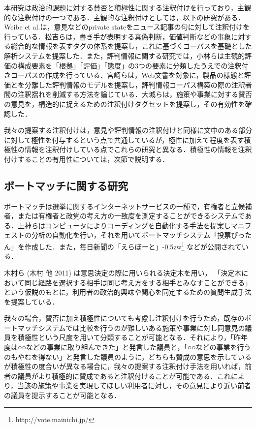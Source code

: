 \documentclass[japanese]{jnlp_1.4}
\begin{document}
本研究は政治的課題に対する賛否と積極性に関する注釈付けを行っており，主観的な注釈付けの一つである．主観的な注釈付けとしては，以下の研究がある．Weibe et al.\cite{wb}は，意見などのprivate stateをニュース記事の句に対して注釈付けを行っている．松吉ら\cite{mtys}は，書き手が表明する真偽判断，価値判断などの事象に対する総合的な情報を表すタグの体系を提案し，これに基づくコーパスを基礎とした解析システムを提案した．また，評判情報に関する研究では，小林ら\cite{kbys}は主観的評価の構成要素を「根拠」「評価」「態度」の3つの要素に分類したうえでの注釈付きコーパスの作成を行っている．宮崎ら\cite{myzk}は，Web文書を対象に，製品の様態と評価とを分離した評判情報のモデルを提案し，評判情報コーパス構築の際の注釈者間の注釈揺れを削減する方法を論じている．大城ら\cite{osr}は，施策や事業に対する賛否の意見を，構造的に捉えるための注釈付けタグセットを提案し，その有効性を確認した．

我々の提案する注釈付けは，意見や評判情報の注釈付けと同様に文中のある部分に対して極性を付与するという点で共通しているが，極性に加えて程度を表す積極性の情報を注釈付けしている点でこれらの研究と異なる．積極性の情報を注釈付けすることの有用性については，次節で説明する．


\subsection{ボートマッチに関する研究}

ボートマッチは選挙に関するインターネットサービスの一種で，有権者と立候補者，または有権者と政党の考え方の一致度を測定することができるシステムである．上神ら\cite{uekm,uekm2,kgm}はコンピュータによりコーディングを自動化する手法を提案しマニフェストの分析の自動化を行い，それを用いてボートマッチシステム「投票ぴったん」を作成した．また，毎日新聞の「えらぼーと」{\kern-0.5zw}\footnote{http://vote.mainichi.jp/} などが公開されている．

    木村ら (木村 他 2011) は意思決定の際に用いられる決定木を用い，
「決定木において同じ経路を選択する相手は同じ考え方をする相手とみなすことができる」という仮説のもとに，利用者の政治的興味や関心を同定するための質問生成手法を提案している．

我々の場合，賛否に加え積極性についても考慮し注釈付けを行うため，既存のボートマッチシステムでは比較を行うのが難しいある施策や事業に対し同意見の議員を積極性という尺度を用いて分類することが可能となる．それにより，「昨年度は○○などの事業に取り組んできた」と発言した議員と，「○○などの事業を行うのもやむを得ない」と発言した議員のように，どちらも賛成の意思を示しているが積極性の度合いが異なる場合に，我々の提案する注釈付け手法を用いれば，前者の議員がより積極的に賛成であると注釈付けることが可能である．これにより，当該の施策や事業を実現してほしい利用者に対し，その意見により近い前者の議員を提示することが可能となる． 
\end{document}
